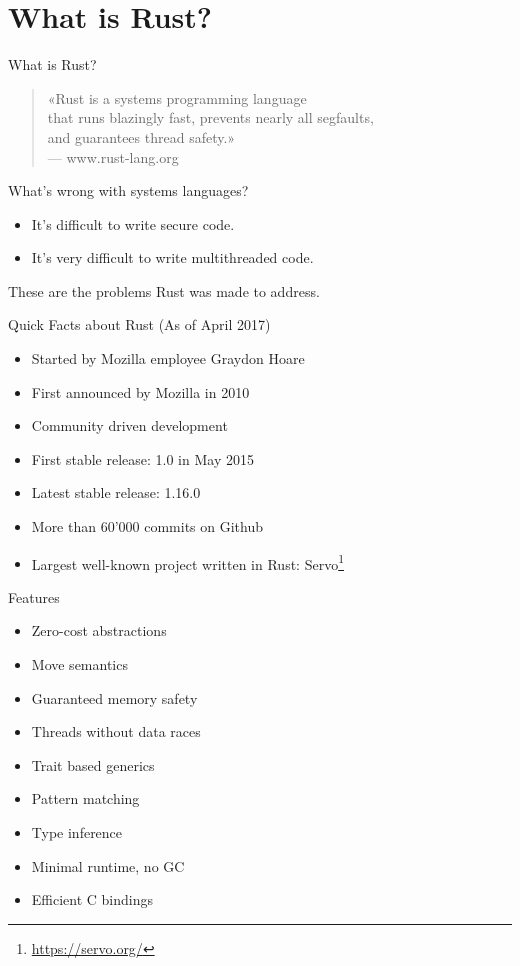 \section{What is Rust?}


\begin{frame}[c]{What is Rust?}
	\begin{quote}
		«Rust is a systems programming language\\
		that runs blazingly fast, prevents nearly all segfaults,\\
		and guarantees thread safety.»\\
		\vspace{0.5em}
		{\normalfont \small --- www.rust-lang.org}
	\end{quote}
\end{frame}


\begin{frame}{What's wrong with systems languages?}
	\begin{itemize}
		\item It's difficult to write secure code.
		\item It's very difficult to write multithreaded code.
	\end{itemize}
	These are the problems Rust was made to address.
\end{frame}


\begin{frame}{Quick Facts about Rust}
	(As of April 2017)
	\begin{itemize}
		\item Started by Mozilla employee Graydon Hoare
		\item First announced by Mozilla in 2010
		\item Community driven development
		\item First stable release: 1.0 in May 2015
		\item Latest stable release: 1.16.0
		\item More than 60'000 commits on Github
		\item Largest well-known project written in Rust: Servo\footnote{\url{https://servo.org/}}
	\end{itemize}
\end{frame}


\begin{frame}{Features}
	\begin{itemize}
		\item Zero-cost abstractions
		\item Move semantics
		\item Guaranteed memory safety
		\item Threads without data races
		\item Trait based generics
		\item Pattern matching
		\item Type inference
		\item Minimal runtime, no GC
		\item Efficient C bindings
	\end{itemize}
\end{frame}
